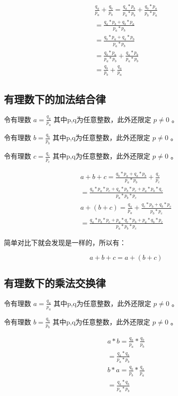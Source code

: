 \documentclass[12pt,oneside]{book}
\begin{document}
\begin{align*}
\frac{q_a}{p_a} + \frac{q_b}{p_b} = \frac{q_a *p_b}{p_a * p_b} + \frac{q_b * p_a}{p_b * p_a}\\
= \frac{q_a * p_b + q_b * p_a}{p_a * p_b} \\
= \frac{q_b * p_a + q_a * p_b}{p_a * p_b} \\
= \frac{q_b*p_a}{p_a*p_b} + \frac{q_a * p_b}{p_a * p_b}\\
= \frac{q_b}{p_b} + \frac{q_a}{p_a}
\end{align*}


\subsection{有理数下的加法结合律}
令有理数 $a = \frac{q_a}{p_a}$ 其中p,q为任意整数，此外还限定 $p \neq 0$ 。

令有理数 $b = \frac{q_b}{p_b}$ 其中p,q为任意整数，此外还限定 $p \neq 0$ 。

令有理数 $c = \frac{q_c}{p_c}$ 其中p,q为任意整数，此外还限定 $p \neq 0$ 。


\begin{align*}
a + b + c = \frac{q_b * p_a + q_a * p_b}{p_a * p_b} + \frac{q_c}{p_c}\\
=\frac{q_b*p_a*p_c + q_a*p_b*p_c + p_a*p_b*q_c}{p_a*p_b*p_c}\\
a + (b + c) =  \frac{q_a}{p_a} + \frac{q_c * p_b + q_b * p_c}{p_b * p_c}\\
=\frac{q_a*p_b*p_c + p_a*q_c*p_b + p_a*q_b*p_c}{p_a*p_b*p_c}
\end{align*}

简单对比下就会发现是一样的，所以有：

\begin{equation}
a + b + c  = a+(b+c)
\end{equation}



\subsection{有理数下的乘法交换律}
令有理数 $a = \frac{q_a}{p_a}$ 其中p,q为任意整数，此外还限定 $p \neq 0$ 。

令有理数 $b = \frac{q_b}{p_b}$ 其中p,q为任意整数，此外还限定 $p \neq 0$ 。

\begin{align*}
a * b = \frac{q_a}{p_a} * \frac{q_b}{p_b}\\
= \frac{q_a * q_b}{p_a*p_b} \\
b * a =  \frac{q_b}{p_b} * \frac{q_a}{p_a} \\
= \frac{q_a * q_b}{p_a*p_b} 
\end{align*}
\end{document}
